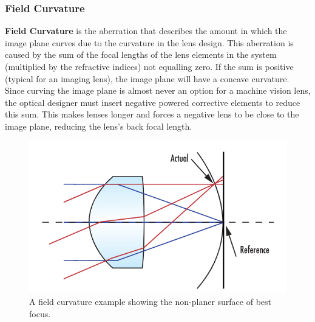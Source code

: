 \documentclass[10pt]{article}
\begin{document}
\begin{multicols}{2}
\subsubsection{Field Curvature}
\textbf{Field Curvature} is the aberration that describes the amount in which the image plane curves due to the curvature in the lens design. This aberration is caused by the sum of the focal lengths of the lens elements in the system (multiplied by the refractive indices) not equalling zero. If the sum is positive (typical for an imaging lens), the image plane will have a concave curvature. Since curving the image plane is almost never an option for a machine vision lens, the optical designer must insert negative powered corrective elements to reduce this sum. This makes lenses longer and forces a negative lens to be close to the image plane, reducing the lens's back focal length.
\begin{figure}[H]
    \centering
    \includegraphics[width=0.8\linewidth]{Images/Week 1/curvature.png}
    \caption{A field curvature example showing the non-planer surface of best focus.}
    \label{fig:curvature}
\end{figure}

\end{multicols}
\end{document}
